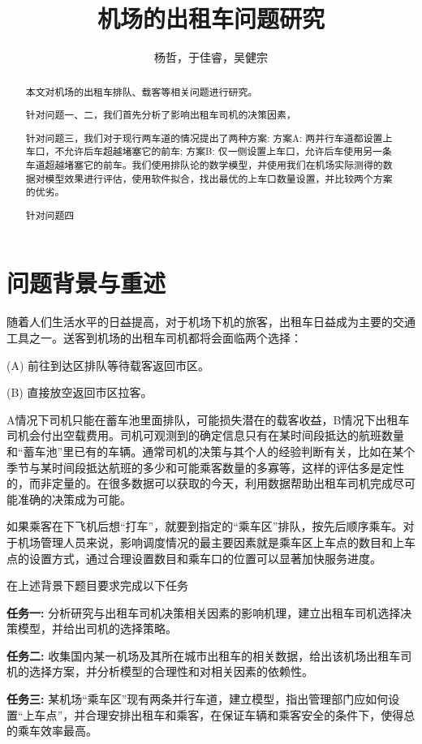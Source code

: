 \documentclass[UTF8]{ctexart}
\title{机场的出租车问题研究}
\author{杨哲，于佳睿，吴健宗}
\begin{document}
	\maketitle
	\begin{abstract}
		本文对机场的出租车排队、载客等相关问题进行研究。
		
		针对问题一、二，我们首先分析了影响出租车司机的决策因素，
		
		针对问题三，我们对于现行两车道的情况提出了两种方案: 方案A: 两并行车道都设置上车口，不允许后车超越堵塞它的前车; 方案B: 仅一侧设置上车口，允许后车使用另一条车道超越堵塞它的前车。我们使用排队论的数学模型，并使用我们在机场实际测得的数据对模型效果进行评估，使用软件拟合，找出最优的上车口数量设置，并比较两个方案的优劣。
		
		针对问题四
	\end{abstract}
	
	\section{问题背景与重述}
	随着人们生活水平的日益提高，对于机场下机的旅客，出租车日益成为主要的交通工具之一。送客到机场的出租车司机都将会面临两个选择：
	
	(A) 前往到达区排队等待载客返回市区。
	
	(B) 直接放空返回市区拉客。 
	
	A情况下司机只能在蓄车池里面排队，可能损失潜在的载客收益，B情况下出租车司机会付出空载费用。司机可观测到的确定信息只有在某时间段抵达的航班数量和“蓄车池”里已有的车辆。通常司机的决策与其个人的经验判断有关，比如在某个季节与某时间段抵达航班的多少和可能乘客数量的多寡等，这样的评估多是定性的，而非定量的。在很多数据可以获取的今天，利用数据帮助出租车司机完成尽可能准确的决策成为可能。
	
	如果乘客在下飞机后想“打车”，就要到指定的“乘车区”排队，按先后顺序乘车。对于机场管理人员来说，影响调度情况的最主要因素就是乘车区上车点的数目和上车点的设置方式，通过合理设置数目和乘车口的位置可以显著加快服务进度。
	
	在上述背景下题目要求完成以下任务
	
	\textbf{任务一:} 分析研究与出租车司机决策相关因素的影响机理，建立出租车司机选择决策模型，并给出司机的选择策略。
	
	\textbf{任务二:} 收集国内某一机场及其所在城市出租车的相关数据，给出该机场出租车司机的选择方案，并分析模型的合理性和对相关因素的依赖性。
	
	\textbf{任务三:} 某机场“乘车区”现有两条并行车道，建立模型，指出管理部门应如何设置“上车点”，并合理安排出租车和乘客，在保证车辆和乘客安全的条件下，使得总的乘车效率最高。
	
\end{document}
